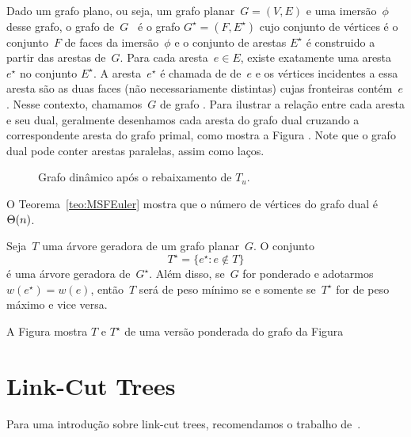 Dado um grafo plano, ou seja, um grafo planar~$G=(V,E)$ e uma imersão~$\phi$ desse grafo, o grafo  de~$G$~\cite{planarTheoryAlgorith} é o grafo $G^\star = (F,E^\star)$ cujo conjunto de vértices é o conjunto~$F$ de faces da imersão~$\phi$ e o conjunto de arestas $E^\star$ é construido a partir das arestas de~$G$.
Para cada aresta~$e\in E$, existe exatamente uma aresta~$e^\star$ no conjunto $E^\star$.
A aresta~$e^\star$ é chamada de  de~$e$ e os vértices incidentes a essa aresta são as duas faces (não necessariamente distintas) cujas fronteiras contém~$e$.
Nesse contexto, chamamos~$G$ de grafo .
Para ilustrar a relação entre cada aresta e seu dual, geralmente desenhamos cada aresta do grafo dual cruzando a correspondente aresta do grafo primal, como mostra a Figura .
Note que o grafo dual pode conter arestas paralelas, assim como laços.

\begin{figure}[htb]
\centering
\caption{Grafo dinâmico após o rebaixamento de $T_u$.}
\label{fig:MSF-figura-2-dual}
\end{figure}


O Teorema~\ref{teo:MSFEuler} mostra que o número de vértices do grafo dual é $\Theta(n)$.

\begin{theorem}
\label{teo:MSFdual}
Seja~$T$ uma árvore geradora de um grafo planar~$G$. O conjunto
$$
T^\star = \{e^\star:e\notin T\}
$$
é uma árvore geradora de~$G^\star$.
Além disso, se~$G$ for ponderado e adotarmos $w(e^\star) = w(e)$, então~$T$ será de peso mínimo se e somente se~$T^\star$ for de peso máximo e vice versa.
\end{theorem}

A Figura  mostra $T$ e $T^\star$ de uma versão ponderada do grafo da Figura 



\section{Link-Cut Trees}
\label{sec:linkcuttree}

Para uma introdução sobre link-cut trees, recomendamos o trabalho de~\cite{linkcuttree}.

